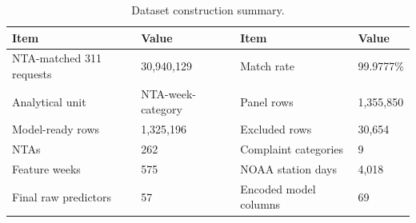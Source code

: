 \begin{table}[t]
\caption{Dataset construction summary.}\label{tab:data_summary}
\centering
\begin{tabular}{@{}llll@{}}
\toprule
Item & Value & Item & Value \\
\midrule
NTA-matched 311 requests & 30,940,129 & Match rate & 99.9777\% \\
Analytical unit & NTA-week-category & Panel rows & 1,355,850 \\
Model-ready rows & 1,325,196 & Excluded rows & 30,654 \\
NTAs & 262 & Complaint categories & 9 \\
Feature weeks & 575 & NOAA station days & 4,018 \\
Final raw predictors & 57 & Encoded model columns & 69 \\
\bottomrule
\end{tabular}
\end{table}
